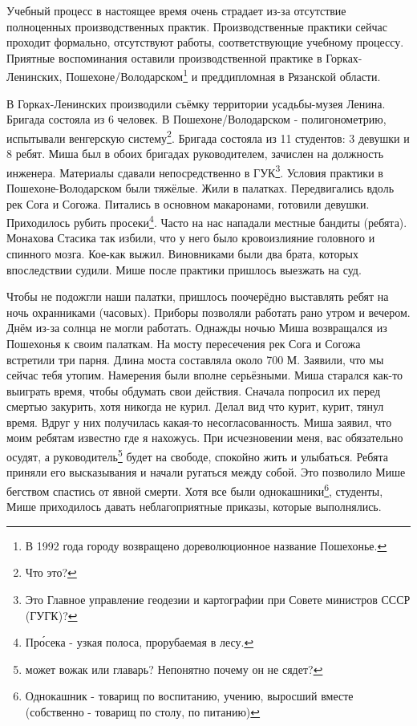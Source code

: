 Учебный процесс в настоящее время очень страдает из-за отсутствие полноценных производственных практик. Производственные практики сейчас проходит формально, отсутствуют работы, соответствующие учебному процессу. Приятные воспоминания оставили производственной практике в Горках-Ленинских, Пошехоне\-/Володарском\footnote{В 1992 года городу возвращено дореволюционное название Пошехонье.} и преддипломная в Рязанской области.

В Горках-Ленинских производили съёмку территории усадьбы-музея Ленина. Бригада состояла из 6 человек. В Пошехоне\-/Володарском - полигонометрию, испытывали венгерскую систему\footnote{Что это?}. Бригада состояла из 11 студентов: 3 девушки и 8 ребят. Миша был в обоих бригадах руководителем, зачислен на должность инженера. Материалы сдавали непосредственно в ГУК\footnote{Это Главное управление геодезии и картографии при Совете министров СССР (ГУГК)?}. Условия практики в Пошехоне-Володарском были тяжёлые. Жили в палатках. Передвигались вдоль рек Сога и Согожа. Питались в основном макаронами, готовили девушки. Приходилось рубить просеки\footnote{Пр\'{о}сека - узкая полоса, прорубаемая в лесу.}. Часто на нас нападали местные бандиты (ребята). Монахова Стасика так избили, что у него было кровоизлияние головного и спинного мозга. Кое-как выжил. Виновниками были два брата, которых впоследствии судили. Мише после практики пришлось выезжать на суд. 

Чтобы не подожгли наши палатки, пришлось поочерёдно выставлять ребят на ночь охранниками (часовых). Приборы позволяли работать рано утром и вечером. Днём из-за солнца не могли работать. Однажды ночью Миша возвращался из Пошехонья к своим палаткам. На мосту пересечения рек Сога и Согожа встретили три парня. Длина моста составляла около 700 М. Заявили, что мы сейчас тебя утопим. Намерения были вполне серьёзными. Миша старался как-то выиграть время, чтобы обдумать свои действия. Сначала попросил их перед смертью закурить, хотя никогда не курил. Делал вид что курит, курит, тянул время. Вдруг у них получилась какая-то несогласованность. Миша заявил, что моим ребятам известно где я нахожусь. При исчезновении меня, вас обязательно осудят, а руководитель\footnote{может вожак или главарь? Непонятно почему он не сядет?} будет на свободе, спокойно жить и улыбаться. Ребята приняли его высказывания и начали ругаться между собой. Это позволило Мише бегством спастись от явной смерти. Хотя все были однокашники\footnote{Однокашник - товарищ по воспитанию, учению, выросший вместе (собственно - товарищ по столу, по питанию)}, студенты, Мише приходилось давать неблагоприятные приказы, которые выполнялись.

